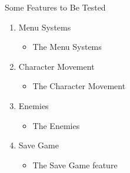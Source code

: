 
\centerline{Some Features to Be Tested}

\begin{enumerate}
   \item Menu Systems
   \begin{itemize}
     \item The Menu Systems 
   \end{itemize}
  
  \item Character Movement
   \begin{itemize}
     \item The Character Movement

   \end{itemize}

     \item Enemies 
   \begin{itemize}
     \item The Enemies
   \end{itemize}



 \item Save Game
   \begin{itemize}
 	\item 
 	The Save Game feature 
 	 \end{itemize}
 	 \end{enumerate}
